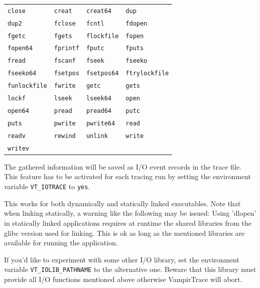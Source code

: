 \documentclass[a4paper,twoside,12pt,BCOR12mm]{scrbook}
\begin{document}
  \latex{\vspace{1ex}}
  \begin{tabular}{p{}p{}p{}p{}}
  \texttt{close} & \texttt{creat} & \texttt{creat64} & \texttt{dup} \\
  \texttt{dup2} & \texttt{fclose} & \texttt{fcntl} & \texttt{fdopen} \\
  \texttt{fgetc} & \texttt{fgets} & \texttt{flockfile} & \texttt{fopen} \\
  \texttt{fopen64} & \texttt{fprintf} & \texttt{fputc} & \texttt{fputs} \\
  \texttt{fread} & \texttt{fscanf} & \texttt{fseek} & \texttt{fseeko} \\
  \texttt{fseeko64} & \texttt{fsetpos} & \texttt{fsetpos64} & \texttt{ftrylockfile} \\
  \texttt{funlockfile} & \texttt{fwrite} & \texttt{getc} & \texttt{gets} \\
  \texttt{lockf} & \texttt{lseek} & \texttt{lseek64} & \texttt{open} \\
  \texttt{open64} & \texttt{pread} & \texttt{pread64} & \texttt{putc} \\
  \texttt{puts} & \texttt{pwrite} & \texttt{pwrite64} & \texttt{read} \\
  \texttt{readv} & \texttt{rewind} & \texttt{unlink} & \texttt{write} \\
  \texttt{writev} & & & \\
  \end{tabular}
  \latex{\vspace{1ex}}

  \noindent
  The gathered information will be saved
  as I/O event records in the trace file. This feature has to be activated for
  each tracing run by setting the environment variable \texttt{VT\_IOTRACE} to
  \texttt{yes}.

  This works for both dynamically and statically linked executables.
  Note that when linking statically, a warning like the following may be issued: Using 'dlopen' in statically linked applications requires at runtime the shared libraries from the glibc version used for linking.
  This is ok as long as the mentioned libraries are available for running the application.

  If you'd like to experiment with some other I/O library, set the environment variable \texttt{VT\_IOLIB\_PATHNAME} to the alternative one.
  Beware that this library must provide all I/O functions mentioned above otherwise VampirTrace will abort.
\end{document}
